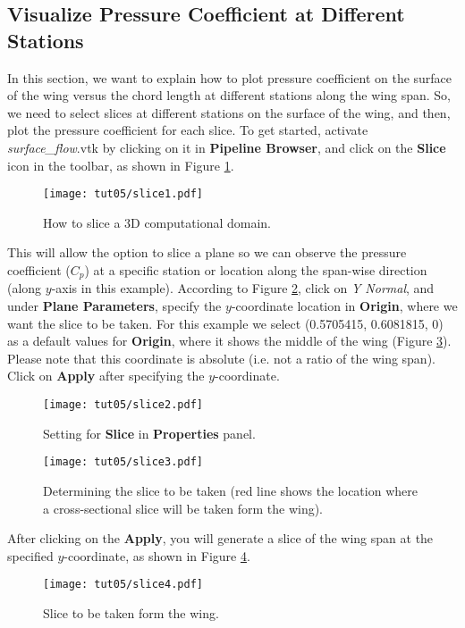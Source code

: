 \subsection{Visualize Pressure Coefficient at Different Stations}
In this section, we want to explain how to plot pressure coefficient on the surface of the wing versus the chord length at different stations along the wing span. So, we need to select slices at different stations on the surface of the wing, and then, plot the pressure coefficient for each slice. To get started, activate \textit{surface\_flow}.vtk by clicking on it in \textbf{Pipeline Browser}, and click on the \textbf{Slice} icon in the toolbar, as shown in Figure \ref{fig5:slice1}.
\begin{figure}[htbp]
    \centering
    \texttt{[image: tut05/slice1.pdf]}
    \caption{How to slice a 3D computational domain.}
    \label{fig5:slice1}
\end{figure}
This will allow the option to slice a plane so we can observe the pressure coefficient ($C_p$) at a specific station
or location along the span-wise direction (along $y$-axis in this example). According to Figure \ref{fig5:slice2}, click on \textit{Y Normal}, and under \textbf{Plane Parameters}, specify the $y$-coordinate location in \textbf{Origin}, where we want the slice to be taken. For this example we select (0.5705415, 0.6081815, 0) as a default values for \textbf{Origin}, where it shows the middle of the wing (Figure \ref{fig5:slice3}). Please note that this coordinate is absolute (i.e. not a ratio of the wing span). Click on \textbf{Apply} after specifying the $y$-coordinate.
\begin{figure}[htbp]
    \centering
    \texttt{[image: tut05/slice2.pdf]}
    \caption{Setting for \textbf{Slice} in \textbf{Properties} panel.}
    \label{fig5:slice2}
\end{figure}
\begin{figure}[htbp]
    \centering
    \texttt{[image: tut05/slice3.pdf]}
    \caption{Determining the slice to be taken (red line shows the location where a cross-sectional slice will be taken form the wing).}
    \label{fig5:slice3}
\end{figure}
After clicking on the \textbf{Apply}, you will generate a slice of the wing span at the specified $y$-coordinate, as shown in Figure \ref{fig5:slice4}.
\begin{figure}[htbp]
    \centering
    \texttt{[image: tut05/slice4.pdf]}
    \caption{Slice to be taken form the wing.}
    \label{fig5:slice4}
\end{figure}
